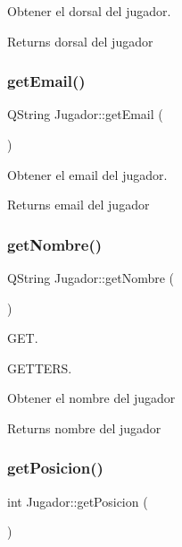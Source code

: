 Obtener el dorsal del jugador. 

\begin{DoxyReturn}{Returns}
dorsal del jugador 
\end{DoxyReturn}
\mbox{\label{classJugador_ac70026da85dea7d05eaaf8df72c4e8eb}} 
\subsubsection{\texorpdfstring{get\+Email()}{getEmail()}}
{\footnotesize\ttfamily Q\+String Jugador\+::get\+Email (\begin{DoxyParamCaption}{ }\end{DoxyParamCaption})}



Obtener el email del jugador. 

\begin{DoxyReturn}{Returns}
email del jugador 
\end{DoxyReturn}
\mbox{\label{classJugador_a326995f44b24a9a5247144868f2ba359}} 
\subsubsection{\texorpdfstring{get\+Nombre()}{getNombre()}}
{\footnotesize\ttfamily Q\+String Jugador\+::get\+Nombre (\begin{DoxyParamCaption}{ }\end{DoxyParamCaption})}



G\+ET. 

G\+E\+T\+T\+E\+RS.

Obtener el nombre del jugador \begin{DoxyReturn}{Returns}
nombre del jugador 
\end{DoxyReturn}
\mbox{\label{classJugador_afd85bc493fbd7626cdee30d9a2e18fd2}} 
\subsubsection{\texorpdfstring{get\+Posicion()}{getPosicion()}}
{\footnotesize\ttfamily int Jugador\+::get\+Posicion (\begin{DoxyParamCaption}{ }\end{DoxyParamCaption})}




